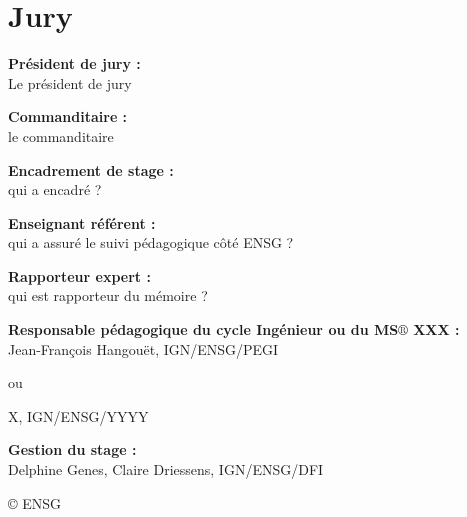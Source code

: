 \thispagestyle{plain}
\section*{Jury}
\vspace{0.5cm}

\textbf{Président de jury :} \\

Le président de jury

\vspace{0.5cm}

\textbf{Commanditaire :} \\

le commanditaire

\vspace{0.5cm}

\textbf{Encadrement de stage :} \\ 


qui a encadré ?

\vspace{0.5cm}

\textbf{Enseignant référent :} \\ 

qui a assuré le suivi pédagogique côté ENSG ?

\vspace{0.5cm}

\textbf{Rapporteur expert :} \\ 

qui est rapporteur du mémoire ?

\vspace{0.5cm}

\textbf{Responsable pédagogique du {\color{red} cycle Ingénieur} ou du {\color{magenta}MS$\circledR$ XXX} :} \\



{\color{red}Jean-François Hangouët, IGN/ENSG/PEGI}

ou 

{\color{magenta}
X, IGN/ENSG/YYYY
}

\vspace{0.5cm}

\textbf{Gestion du stage :} \\ 

Delphine Genes, Claire Driessens, IGN/ENSG/DFI

\vspace{0.5cm}


\copyright \hspace{0.3cm} ENSG

